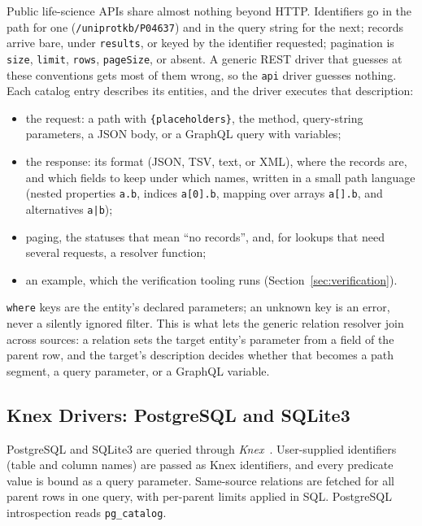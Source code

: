 \documentclass[sigconf,nonacm]{acmart}
\begin{document}
Public life-science APIs share almost nothing beyond HTTP.  Identifiers
go in the path for one (\texttt{/uniprotkb/P04637}) and in the query
string for the next; records arrive bare, under \texttt{results}, or
keyed by the identifier requested; pagination is \texttt{size},
\texttt{limit}, \texttt{rows}, \texttt{pageSize}, or absent.  A generic
REST driver that guesses at these conventions gets most of them wrong,
so the \texttt{api} driver guesses nothing.  Each catalog entry
describes its entities, and the driver executes that description:
\begin{itemize}
  \item the request: a path with \texttt{\{placeholders\}}, the method,
        query-string parameters, a JSON body, or a GraphQL query with
        variables;
  \item the response: its format (JSON, TSV, text, or XML), where the
        records are, and which fields to keep under which names, written
        in a small path language (nested properties \texttt{a.b},
        indices \texttt{a[0].b}, mapping over arrays \texttt{a[].b},
        and alternatives \texttt{a|b});
  \item paging, the statuses that mean ``no records'', and, for
        lookups that need several requests, a resolver function;
  \item an example, which the verification tooling runs
        (Section~\ref{sec:verification}).
\end{itemize}
\texttt{where} keys are the entity's declared parameters; an unknown key
is an error, never a silently ignored filter.  This is what lets the
generic relation resolver join across sources: a relation sets the
target entity's parameter from a field of the parent row, and the
target's description decides whether that becomes a path segment, a
query parameter, or a GraphQL variable.

\subsection{Knex Drivers: PostgreSQL and SQLite3}

PostgreSQL and SQLite3 are queried through \emph{Knex}~\cite{knex}.
User-supplied identifiers (table and column names) are passed as Knex
identifiers, and every predicate value is bound as a query parameter.
Same-source relations are fetched for all parent rows in one query,
with per-parent limits applied in SQL.  PostgreSQL introspection reads
\texttt{pg\_catalog}.
\end{document}

